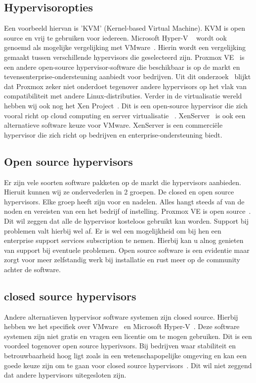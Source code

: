 \subsection{Hypervisoropties}
Een voorbeeld hiervan is 'KVM' (Kernel-based Virtual Machine)\autocite{KVM}. KVM is open source en vrij te gebruiken voor iedereen\autocite{KVM}. Microsoft Hyper-V ~\autocite{Eaton2019} wordt ook genoemd als mogelijke vergelijking met VMware~\autocite{fayyad2013benchmarking}. Hierin wordt een vergelijking gemaakt tussen verschillende hypervisors die geselecteerd zijn. \newline
Proxmox VE~\autocite{Proxmox} is een andere open-source hypervisor-software die beschikbaar is op de markt en tevens\newline enterprise-ondersteuning aanbiedt voor bedrijven. Uit dit onderzoek~\autocite{Hale2024} blijkt dat Proxmox zeker niet onderdoet tegenover andere hypervisors op het vlak van compatibiliteit met andere Linux-distributies.
Verder in de virtualisatie wereld hebben wij ook nog het Xen Project~\autocite{xenproject}. Dit is een open-source hypervisor die zich vooral richt op cloud computing en server virtualisatie ~\autocite{binu2011virtualization}.
XenServer~\autocite{xenserver} is ook een alternatieve software keuze voor VMware. XenServer is een commerciële hypervisor die zich richt op bedrijven en enterprise-ondersteuning biedt.

\subsection{Open source hypervisors}
Er zijn vele soorten software pakketen op de markt die hypervisors aanbieden. Hieruit kunnen wij ze ondervederlen in 2 groepen. De closed en open source hypervisors. Elke groep heeft zijn voor en nadelen. Alles hangt steeds af van de noden en vereisten van een het bedrijf of instelling.
Proxmox VE is open source~\autocite{Proxmox}. Dit wil zeggen dat alle de hypervisor kosteloos gebruikt kan worden. Support bij problemen valt hierbij wel af. Er is wel een mogelijkheid om bij hen een enterprise support services subscription te nemen. Hierbij kan u alnog genieten van support bij eventuele problemen.
Open source software is een evidentie maar zorgt voor meer zelfstandig werk bij installatie en rust meer op de community achter de software.
\subsection{closed source hypervisors}
Andere alternatieven hypervisor software systemen zijn closed source. Hierbij hebben we het specifiek over VMware~\autocite{vmware} en Microsoft Hyper-V~\autocite{Eaton2019}. Deze software systemen zijn niet gratis en vragen een licentie om te mogen gebruiken. Dit is een voordeel togenover open source hyperivsors.
Bij bedrijven waar stabiliteit en betrouwbaarheid hoog ligt zoals in een wetenschapopelijke omgeving en kan een goede keuze zijn om te gaan voor closed source hypervisors~\autocite{voras2012early}. Dit wil niet zeggend dat andere hypervisors uitegesloten zijn.
